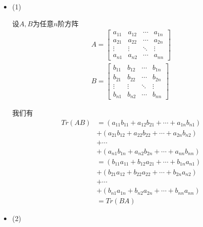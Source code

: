 \documentclass{article}
\begin{document}
\begin{itemize}
  \item (1)

        设$A, B$为任意$n$阶方阵
        \begin{align*}
          A = \begin{bmatrix}
                a_{11} & a_{12} & \cdots & a_{1n} \\
                a_{21} & a_{22} & \cdots & a_{2n} \\
                \vdots & \vdots & \ddots & \vdots \\
                a_{n1} & a_{n2} & \cdots & a_{nn}
              \end{bmatrix} \\
          B = \begin{bmatrix}
                b_{11} & b_{12} & \cdots & b_{1n} \\
                b_{21} & b_{22} & \cdots & b_{2n} \\
                \vdots & \vdots & \ddots & \vdots \\
                b_{n1} & b_{n2} & \cdots & b_{nn}
              \end{bmatrix}
        \end{align*}

        我们有
        \begin{align*}
          Tr(AB) & = (a_{11}b_{11} + a_{12}b_{21} + \cdots + a_{1n}b_{n1}) \\
                 & + (a_{21}b_{12} + a_{22}b_{22} + \cdots + a_{2n}b_{n2}) \\
                 & + \cdots                                                \\
                 & + (a_{n1}b_{1n} + a_{n2}b_{2n} + \cdots + a_{nn}b_{nn}) \\
                 & = (b_{11}a_{11} + b_{12}a_{21} + \cdots + b_{1n}a_{n1}) \\
                 & + (b_{21}a_{12} + b_{22}a_{22} + \cdots + b_{2n}a_{n2}) \\
                 & + \cdots                                                \\
                 & + (b_{n1}a_{1n} + b_{n2}a_{2n} + \cdots + b_{nn}a_{nn}) \\
                 & = Tr(BA)
        \end{align*}

  \item (2)


\end{itemize}
\end{document}
